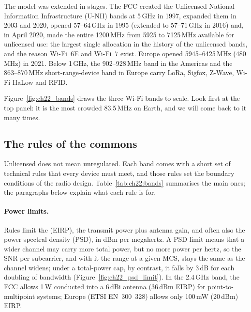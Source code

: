 The model was extended in stages. The FCC created the Unlicensed National Information
Infrastructure (U-NII) bands at 5\,GHz in 1997, expanded them in 2003 and 2020, opened 57--64\,GHz
in 1995 (extended to 57--71\,GHz in 2016) and, in April 2020, made the entire 1200\,MHz from 5925 to
7125\,MHz available for unlicensed use: the largest single allocation in the history of the
unlicensed bands, and the reason Wi-Fi~6E and Wi-Fi~7 exist. Europe opened 5945--6425\,MHz
(480\,MHz) in 2021. Below 1\,GHz, the 902--928\,MHz band in the Americas and the 863--870\,MHz
short-range-device band in Europe carry LoRa, Sigfox, Z-Wave, Wi-Fi HaLow and RFID.

Figure~\ref{fig:ch22_bands} draws the three Wi-Fi bands to scale. Look first at the top panel: it
is the most crowded 83.5\,MHz on Earth, and we will come back to it many times.


\subsection{The rules of the commons}

Unlicensed does not mean unregulated. Each band comes with a short set of technical rules that
every device must meet, and those rules set the boundary conditions of the radio design.
Table~\ref{tab:ch22:bands} summarises the main ones; the paragraphs below explain what each rule is
for.

\paragraph{Power limits.} Rules limit the  (EIRP),
the transmit power plus antenna gain, and often also the power spectral density (PSD), in dBm per
megahertz. A PSD limit means that a wider channel may carry more total power, but no more power
per hertz, so the SNR per subcarrier, and with it the range at a given MCS, stays the same as the
channel widens; under a total-power cap, by contrast, it falls by 3\,dB for each doubling of
bandwidth (Figure~\ref{fig:ch22_psd_limit}). In the 2.4\,GHz band, the FCC allows 1\,W conducted
into a 6\,dBi antenna (36\,dBm EIRP) for point-to-multipoint systems; Europe (ETSI EN~300~328)
allows only 100\,mW (20\,dBm) EIRP.

